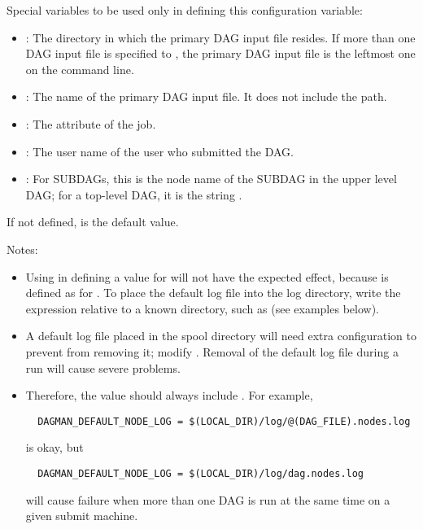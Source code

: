 \begin{description}
  Special variables to be used only in defining this configuration variable:
  \begin{itemize}
  \item {}: The directory in which the primary DAG input file
  resides.
  If more than one DAG input file is specified to ,
  the primary DAG input file is the leftmost one on the command line.
  \item {}: The name of the primary DAG input file.
  It does not include the path.
  \item {}: The  attribute of 
  the  job.
  \item {}: The user name of the user who submitted the
  DAG.
  \item {}: For SUBDAGs, this is the node name of the SUBDAG
  in the upper level DAG; for a top-level DAG, it is the string .
  \end{itemize}

  If not defined, 
   is the default value.

  Notes:
  \begin{itemize}
  \item Using  in defining a value for 
   will not have the expected effect,
  because  is defined as  for .
  To place the default log file into the log directory,
  write the expression relative to a known directory,
  such as  (see examples below).
  \item A default log file placed in the spool directory
  will need extra configuration to prevent  from removing it;
  modify .
  Removal of the default log file during a run will cause severe problems.
  \item {}
  Therefore, the value should always include .
  For example,
  \begin{verbatim}
  DAGMAN_DEFAULT_NODE_LOG = $(LOCAL_DIR)/log/@(DAG_FILE).nodes.log
  \end{verbatim}
  is okay, but
  \begin{verbatim}
  DAGMAN_DEFAULT_NODE_LOG = $(LOCAL_DIR)/log/dag.nodes.log
  \end{verbatim}
  will cause failure when more than one DAG is run at the same time on a
  given submit machine.
  \end{itemize}


\end{description}
